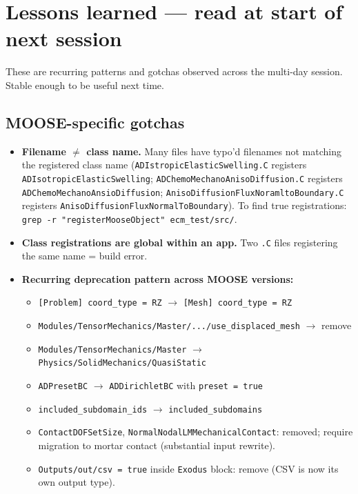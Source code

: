 \documentclass[11pt,letterpaper]{article}
\newenvironment{tightitemize}{\begin{itemize}\setlength\itemsep{0pt}\setlength\parsep{0pt}}{\end{itemize}}
\newcommand{\code}[1]{\texttt{\small #1}}
\begin{document}
\section{Lessons learned --- read at start of next session}
\label{sec:lessons}

These are recurring patterns and gotchas observed across the multi-day session. Stable enough to be useful next time.

\subsection{MOOSE-specific gotchas}

\begin{tightitemize}
  \item \textbf{Filename $\neq$ class name.} Many files have typo'd filenames not matching the registered class name (\code{ADIstropicElasticSwelling.C} registers \code{ADIsotropicElasticSwelling}; \code{ADChemoMechanoAnisoDiffusion.C} registers \code{ADChemoMechanoAnsioDiffusion}; \code{AnisoDiffusionFluxNoramltoBoundary.C} registers \code{AnisoDiffusionFluxNormalToBoundary}). To find true registrations: \code{grep -r "registerMooseObject" ecm\_test/src/}.
  \item \textbf{Class registrations are global within an app.} Two \code{.C} files registering the same name = build error.
  \item \textbf{Recurring deprecation pattern across MOOSE versions:}
    \begin{tightitemize}
      \item \code{[Problem] coord\_type = RZ} $\to$ \code{[Mesh] coord\_type = RZ}
      \item \code{Modules/TensorMechanics/Master/.../use\_displaced\_mesh} $\to$ remove
      \item \code{Modules/TensorMechanics/Master} $\to$ \code{Physics/SolidMechanics/QuasiStatic}
      \item \code{ADPresetBC} $\to$ \code{ADDirichletBC} with \code{preset = true}
      \item \code{included\_subdomain\_ids} $\to$ \code{included\_subdomains}
      \item \code{ContactDOFSetSize}, \code{NormalNodalLMMechanicalContact}: removed; require migration to mortar contact (substantial input rewrite).
      \item \code{Outputs/out/csv = true} inside \code{Exodus} block: remove (CSV is now its own output type).
    \end{tightitemize}

\end{tightitemize}
\end{document}
